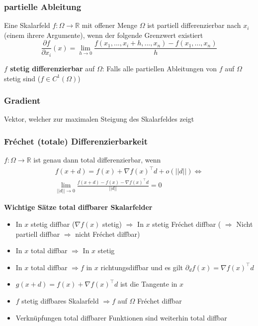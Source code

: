 \begin{sectionbox}
    \subsubsection{partielle Ableitung}
    Eine Skalarfeld $f:\Omega \rightarrow \mathbb R$ mit offener Menge $\Omega$ ist partiell differenzierbar nach $x_i$ (einem ihrere Argumente), wenn der folgende Grenzwert existiert
    \begin{equation*}
        \frac{\partial f}{\partial x_i}(x)=\lim_{h\rightarrow 0}\frac{f(x_1,...,x_i+h,...,x_n)-f(x_1,...,x_n)}{h}
    \end{equation*}

    \textbf{$f$ stetig differenzierbar} auf $\Omega$: Falls alle partiellen Ableitungen von $f$ auf $\Omega$ stetig sind ($f \in C^1(\Omega)$)
\end{sectionbox}

\subsubsection{Gradient}
Vektor, welcher zur maximalen Steigung des Skalarfeldes zeigt

\subsubsection{Fréchet (totale) Differenzierbarkeit}
$f: \Omega \rightarrow \mathbb R$ ist genau dann total differenzierbar, wenn
\begin{align*}
    f(x+d)=f(x)+\nabla f(x)^\top d+o(||d||) \Longleftrightarrow \\
    \lim_{||d|| \rightarrow 0}\frac{f(x+d)-f(x)-\nabla f(x)^\top d}{||d||}=0
\end{align*}

\begin{sectionbox}
    \textbf{Wichtige Sätze total diffbarer Skalarfelder}
    \begin{itemize}
        \item In $x$ stetig diffbar ($\nabla f(x)$ stetig) $\Rightarrow$ In $x$ stetig Fréchet diffbar ( $\Rightarrow$ Nicht partiell diffbar $\Rightarrow$ nicht Fréchet diffbar)
        \item In $x$ total diffbar $\Rightarrow$ In $x$ stetig
        \item In $x$ total diffbar $\Rightarrow f$ in $x$ richtungsdiffbar und es gilt $\partial_d f(x)=\nabla f(x)^\top d$
        \item $g(x + d)=f(x)+\nabla f(x)^\top d$ ist die Tangente in $x$
        \item $f$ stetig diffbares Skalarfeld $\Rightarrow f$ auf $\Omega$ Fréchet diffbar
        \item Verknüpfungen total diffbarer Funktionen sind weiterhin total diffbar
    \end{itemize}
\end{sectionbox}

